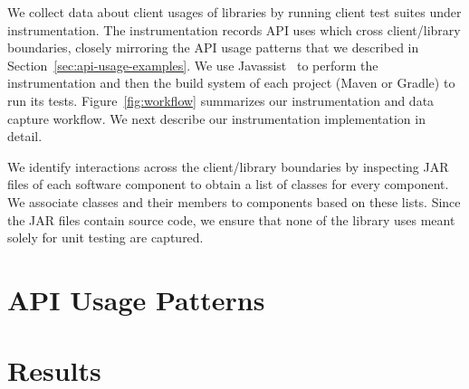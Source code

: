 We collect data about client usages of libraries by running client
test suites under instrumentation. The instrumentation records API
uses which cross client/library boundaries, closely mirroring the API
usage patterns that we described in
Section~\ref{sec:api-usage-examples}. We use
Javassist~\cite{chiba00:_load_struc_reflec_java} to perform the
instrumentation and then the build system of each project (Maven or Gradle) to run its
tests. Figure~\ref{fig:workflow} summarizes our instrumentation and
data capture workflow. We next describe our instrumentation implementation in detail.

We identify interactions across the client/library boundaries by inspecting JAR files of
each software component to obtain a list of classes for every component. We associate classes 
and their members to components based on these lists. Since the JAR files contain source code,
we ensure that none of the library uses meant solely for unit testing are captured.


\section{API Usage Patterns}
\label{sec:patterns}

\section{Results}
\label{sec:results}

